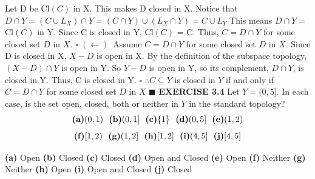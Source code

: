 \documentclass[12pt]{article}
\begin{document}
  Let D be Cl\((C)\) in X. This makes D closed in X.
  \newline
  Notice that \(D \cap Y = (C \cup L_X)\cap Y = (C \cap Y) \cup (L_X \cap Y) = C \cup L_Y\)
  \newline
  This means \(D \cap Y =\) Cl\((C)\) in Y.
  \newline
  Since C is closed in Y, Cl\((C)\) = C.
  \newline
  \newline
  Thus, \(C = D \cap Y\) for some closed set \(D\) in \(X\).
  \newline \(\square\) \newline
  \((\leftarrow)\)\ Assume \(C = D \cap Y\) for some closed set \(D\) in \(X\).
  \newline
  Since D is closed in X, \(X - D\) is open in X.
  \newline
  By the definition of the subspace topology, \((X-D)\cap Y\) is open in Y.
  \newline
  So \(Y-D\) is open in Y, so its complement, \(D \cap Y\), is closed in Y.
  \newline
  Thus, C is closed in Y.
  \newline \(\square\) \newline
  \(\therefore C \subseteq Y\) is closed in \(Y\) if and only if \(C = D \cap Y\) for some closed set \(D\) in \(X\)
  \newline \(\blacksquare\)
  \newpage
  \noindent
  \textbf{EXERCISE 3.4}
  Let \(Y = (0,5]\). In each case, is the set open, closed, both or neither in \(Y\) in the standard topology?
  \newline
  \[\textup{\textbf{(a)}} (0,1)\ \ \textup{\textbf{(b)}} (0,1]\ \ \textup{\textbf{(c)}}\{1\}\ \ \textup{\textbf{(d)}}(0,5]\ \ \textup{\textbf{(e)}} (1,2)\]
  \[\textup{\textbf{(f)}} [1,2)\ \ \textup{\textbf{(g)}} (1,2]\ \ \textup{\textbf{(h)}}[1,2]\ \ \textup{\textbf{(i)}}(4,5]\ \ \textup{\textbf{(j)}} [4,5]\]
  \newline
  \begin{adjustwidth}{1cm}{0cm}
    \begin{flushleft}
      \textbf{(a)} Open \newline
      \textbf{(b)} Closed \newline
      \textbf{(c)} Closed \newline
      \textbf{(d)} Open and Closed \newline
      \textbf{(e)} Open \newline
      \textbf{(f)} Neither \newline
      \textbf{(g)} Neither \newline
      \textbf{(h)} Open \newline
      \textbf{(i)} Open and Closed \newline
      \textbf{(j)} Closed
    \end{flushleft}
  \end{adjustwidth}
\end{document}
